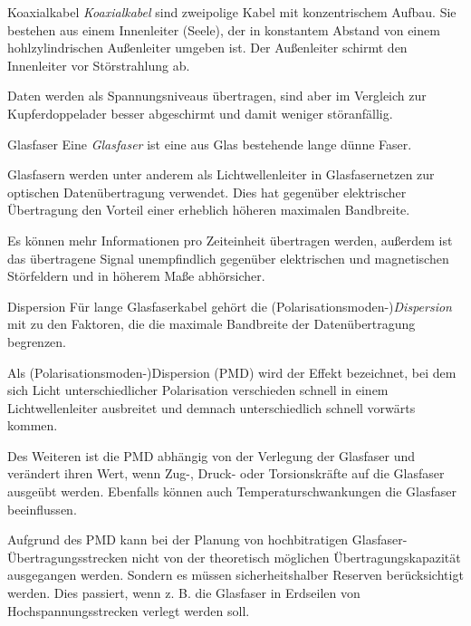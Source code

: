 \begin{defi}{Koaxialkabel}
    \emph{Koaxialkabel} sind zweipolige Kabel mit konzentrischem Aufbau.
    Sie bestehen aus einem Innenleiter (Seele), der in konstantem Abstand von einem hohlzylindrischen Außenleiter umgeben ist.
    Der Außenleiter schirmt den Innenleiter vor Störstrahlung ab.

    Daten werden als Spannungsniveaus übertragen, sind aber im Vergleich zur Kupferdoppelader besser abgeschirmt und damit weniger störanfällig.
\end{defi}

\begin{defi}{Glasfaser}
    Eine \emph{Glasfaser} ist eine aus Glas bestehende lange dünne Faser.

    Glasfasern werden unter anderem als Lichtwellenleiter in Glasfasernetzen zur optischen Datenübertragung verwendet.
    Dies hat gegenüber elektrischer Übertragung den Vorteil einer erheblich höheren maximalen Bandbreite.

    Es können mehr Informationen pro Zeiteinheit übertragen werden, außerdem ist das übertragene Signal unempfindlich gegenüber elektrischen und magnetischen Störfeldern und in höherem Maße abhörsicher.
\end{defi}

\begin{bonus}{Dispersion}
    Für lange Glasfaserkabel gehört die (Polarisationsmoden-)\emph{Dispersion} mit zu den Faktoren, die die maximale Bandbreite der Datenübertragung begrenzen.

    Als (Polarisationsmoden-)Dispersion (PMD) wird der Effekt bezeichnet, bei dem sich Licht unterschiedlicher Polarisation verschieden schnell in einem Lichtwellenleiter ausbreitet und demnach unterschiedlich schnell vorwärts kommen.

    Des Weiteren ist die PMD abhängig von der Verlegung der Glasfaser und verändert ihren Wert, wenn Zug-, Druck- oder Torsionskräfte auf die Glasfaser ausgeübt werden.
    Ebenfalls können auch Temperaturschwankungen die Glasfaser beeinflussen.

    Aufgrund des PMD kann bei der Planung von hochbitratigen Glasfaser-Übertragungsstrecken nicht von der theoretisch möglichen Übertragungskapazität ausgegangen werden.
    Sondern es müssen sicherheitshalber Reserven berücksichtigt werden.
    Dies passiert, wenn z. B. die Glasfaser in Erdseilen von Hochspannungsstrecken verlegt werden soll.
\end{bonus}

